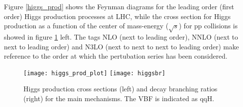 \noindent Figure \ref{higgs_prod} shows the Feynman diagrams for the leading order (first order) Higgs production processes at LHC, while the cross section for Higgs production as a function of the center of mass-energy ($\sqrt{s}$) for pp collisions is showed in figure \ref{hcs_br} left. The tags NLO (next to leading order), NNLO (next to next to leading order) and N3LO (next to next to next to leading order) make reference to the order at which the pertubation series has been considered.

\begin{figure}[!h]
\centering
\texttt{[image: higgs\_prod\_plot]}
\texttt{[image: higgsbr]}
\caption[Higgs production cross section and decay branching ratios]{Higgs production cross sections (left) and decay branching ratios (right) for the main mechanisms. The VBF is indicated as qqH\cite{hcswg}.}
\label{hcs_br}
\end{figure}

